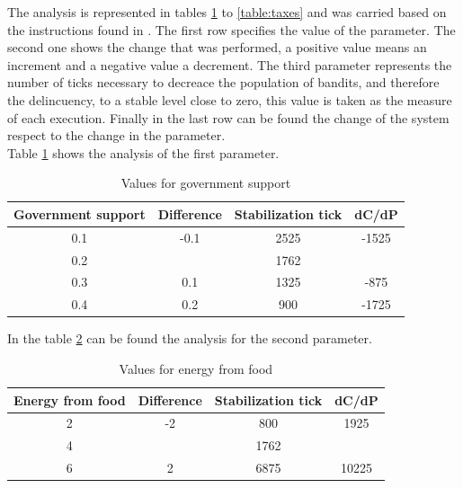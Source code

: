 \documentclass{wscpaperproc}
\begin{document}
The analysis is represented in tables \ref{table:government} to
\ref{table:taxes} and was carried based on the instructions found in
\cite{modbook}. The first row specifies the value of the parameter. The second
one shows the change that was performed, a positive value means an increment
and a negative value a decrement. The third parameter represents the number
of ticks necessary to decreace the population of bandits, and therefore the
delincuency, to a stable level close to zero, this value is taken as the
measure of each execution. Finally in the last row can be found the change of
the system respect to the change in the parameter.\\

Table \ref{table:government} shows the analysis of the first parameter.

\begin{table}[h!]
    \centering
    \begin{tabular}{|c|c|c|c|}
        \hline
        Government support & Difference & Stabilization tick &  dC/dP\\
        \hline
        0.1 & -0.1 & 2525 & -1525\\
        \hline
        \rowcolor{lightgray}
        0.2 &      & 1762 & \\
        \hline
        0.3 & 0.1  & 1325 & -875\\
        \hline
        0.4 & 0.2  & 900 & -1725\\
        \hline
    \end{tabular}
    \caption{Values for government support}
    \label{table:government}
\end{table}

In the table \ref{table:energy} can be found the analysis for the second
parameter.

\begin{table}[h!]
    \centering
    \begin{tabular}{|c|c|c|c|}
        \hline
        Energy from food & Difference & Stabilization tick &  dC/dP\\
        \hline
        2 & -2 & 800 & 1925\\
        \hline
        \rowcolor{lightgray}
        4 &      & 1762 & \\
        \hline
        6 & 2  & 6875 & 10225\\
        \hline
    \end{tabular}
    \caption{Values for energy from food}
    \label{table:energy}
\end{table}
\end{document}
